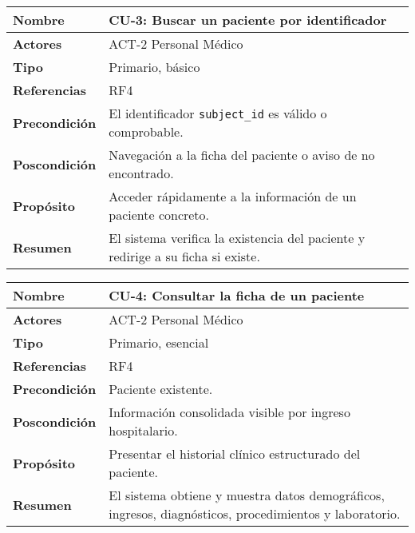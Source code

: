 \begin{table}[H]
    \centering
    \begin{tabular}{|l|p{11cm}|}
        \hline
        \textbf{Nombre} & CU-3: Buscar un paciente por identificador \\
        \hline
        \textbf{Actores} & ACT-2 Personal Médico \\
        \hline
        \textbf{Tipo} & Primario, básico \\
        \hline
        \textbf{Referencias} & RF4 \\
        \hline
        \textbf{Precondición} & El identificador \texttt{subject\_id} es válido o comprobable. \\
        \hline
        \textbf{Poscondición} & Navegación a la ficha del paciente o aviso de no encontrado. \\
        \hline
        \textbf{Propósito} & Acceder rápidamente a la información de un paciente concreto. \\
        \hline
        \textbf{Resumen} & El sistema verifica la existencia del paciente y redirige a su ficha si existe. \\
        \hline
    \end{tabular}
\end{table}

\begin{table}[H]
    \centering
    \begin{tabular}{|l|p{11cm}|}
        \hline
        \textbf{Nombre} & CU-4: Consultar la ficha de un paciente \\
        \hline
        \textbf{Actores} & ACT-2 Personal Médico \\
        \hline
        \textbf{Tipo} & Primario, esencial \\
        \hline
        \textbf{Referencias} & RF4 \\
        \hline
        \textbf{Precondición} & Paciente existente. \\
        \hline
        \textbf{Poscondición} & Información consolidada visible por ingreso hospitalario. \\
        \hline
        \textbf{Propósito} & Presentar el historial clínico estructurado del paciente. \\
        \hline
        \textbf{Resumen} & El sistema obtiene y muestra datos demográficos, ingresos, diagnósticos, procedimientos y laboratorio. \\
        \hline
    \end{tabular}
\end{table}

